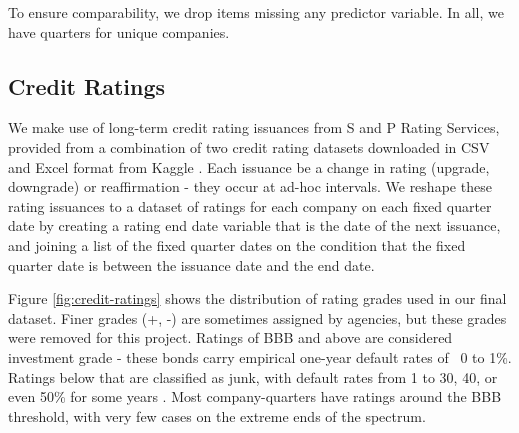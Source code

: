 \documentclass{article}[11pt]
\begin{document}
    To ensure comparability, we drop items missing any predictor variable. In all, we have \numQuarters \space quarters for \numCompanies \space unique companies.

    \subsection*{Credit Ratings}

    We make use of long-term credit rating issuances from S and P Rating Services, provided from a combination of two credit rating datasets downloaded in CSV and Excel format from Kaggle \citep{gewerc_corporate_2020,makwana_corporate_2022}. Each issuance be a change in rating (upgrade, downgrade) or reaffirmation - they occur at ad-hoc intervals. We reshape these rating issuances to a dataset of ratings for each company on each fixed quarter date by creating a rating end date variable that is the date of the next issuance, and joining a list of the fixed quarter dates on the condition that the fixed quarter date is between the issuance date and the end date.

    Figure \ref{fig:credit-ratings} shows the distribution of rating grades used in our final dataset. Finer grades (+, -) are sometimes assigned by agencies, but these grades were removed for this project. Ratings of BBB and above are considered investment grade - these bonds carry empirical one-year default rates of ~0 to 1\%. Ratings below that are classified as junk, with default rates from 1 to 30, 40, or even 50\% for some years \citep{s_and_p_global_ratings_s_2024}. Most company-quarters have ratings around the BBB threshold, with very few cases on the extreme ends of the spectrum.
\end{document}
